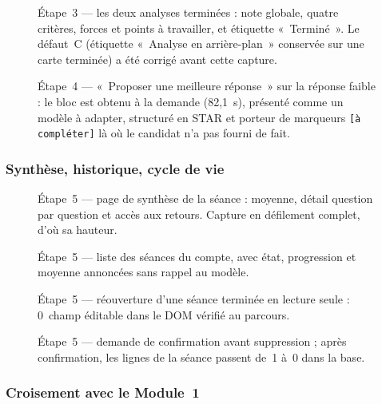 \begin{figure}[H]\centering{}
\caption{Étape~3 --- les deux analyses terminées : note globale, quatre critères,
forces et points à travailler, et étiquette «~Terminé~». Le défaut~C
(étiquette «~Analyse en arrière-plan~» conservée sur une carte terminée) a été
corrigé avant cette capture.}
\end{figure}

\begin{figure}[H]\centering{}
\caption{Étape~4 --- «~Proposer une meilleure réponse~» sur la réponse faible :
le bloc est obtenu à la demande (82,1~s), présenté comme un modèle à adapter,
structuré en STAR et porteur de marqueurs \texttt{[à compléter]} là où le
candidat n'a pas fourni de fait.}
\end{figure}

\subsubsection{Synthèse, historique, cycle de vie}

\begin{figure}[H]\centering{}
\caption{Étape~5 --- page de synthèse de la séance : moyenne, détail question par
question et accès aux retours. Capture en défilement complet, d'où sa hauteur.}
\end{figure}

\begin{figure}[H]\centering{}
\caption{Étape~5 --- liste des séances du compte, avec état, progression et
moyenne annoncées sans rappel au modèle.}
\end{figure}

\begin{figure}[H]\centering{}
\caption{Étape~5 --- réouverture d'une séance terminée en lecture seule :
0~champ éditable dans le DOM vérifié au parcours.}
\end{figure}

\begin{figure}[H]\centering{}
\caption{Étape~5 --- demande de confirmation avant suppression ; après
confirmation, les lignes de la séance passent de~1 à~0 dans la base.}
\end{figure}

\subsubsection{Croisement avec le Module~1}

